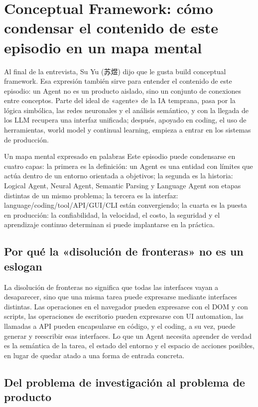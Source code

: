 \section{Conceptual Framework: cómo condensar el contenido de este episodio en un mapa mental}

Al final de la entrevista, Su Yu (苏煜) dijo que le gusta build conceptual framework. Esa expresión también sirve para entender el contenido de este episodio: un Agent no es un producto aislado, sino un conjunto de conexiones entre conceptos. Parte del ideal de «agente» de la IA temprana, pasa por la lógica simbólica, las redes neuronales y el análisis semántico, y con la llegada de los LLM recupera una interfaz unificada; después, apoyado en coding, el uso de herramientas, world model y continual learning, empieza a entrar en los sistemas de producción.

\begin{importantbox}{Un mapa mental expresado en palabras}
Este episodio puede condensarse en cuatro capas: la primera es la definición: un Agent es una entidad con límites que actúa dentro de un entorno orientada a objetivos; la segunda es la historia: Logical Agent, Neural Agent, Semantic Parsing y Language Agent son etapas distintas de un mismo problema; la tercera es la interfaz: language/coding/tool/API/GUI/CLI están convergiendo; la cuarta es la puesta en producción: la confiabilidad, la velocidad, el costo, la seguridad y el aprendizaje continuo determinan si puede implantarse en la práctica.
\end{importantbox}

\subsection{Por qué la «disolución de fronteras» no es un eslogan}

La disolución de fronteras no significa que todas las interfaces vayan a desaparecer, sino que una misma tarea puede expresarse mediante interfaces distintas. Las operaciones en el navegador pueden expresarse con el DOM y con scripts, las operaciones de escritorio pueden expresarse con UI automation, las llamadas a API pueden encapsularse en código, y el coding, a su vez, puede generar y reescribir esas interfaces. Lo que un Agent necesita aprender de verdad es la semántica de la tarea, el estado del entorno y el espacio de acciones posibles, en lugar de quedar atado a una forma de entrada concreta.

\subsection{Del problema de investigación al problema de producto}

